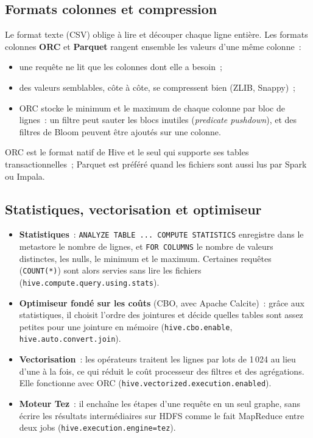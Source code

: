 \subsection{Formats colonnes et compression}

\noindent Le format texte (CSV) oblige à lire et découper chaque ligne entière. Les formats colonnes \textbf{ORC} et \textbf{Parquet} rangent ensemble les valeurs d'une même colonne~:
\begin{itemize}
	\item une requête ne lit que les colonnes dont elle a besoin~;
	\item des valeurs semblables, côte à côte, se compressent bien (ZLIB, Snappy)~;
	\item ORC stocke le minimum et le maximum de chaque colonne par bloc de lignes~: un filtre peut sauter les blocs inutiles (\textit{predicate pushdown}), et des filtres de Bloom peuvent être ajoutés sur une colonne.
\end{itemize}

\noindent ORC est le format natif de Hive et le seul qui supporte ses tables transactionnelles~; Parquet est préféré quand les fichiers sont aussi lus par Spark ou Impala.

\subsection{Statistiques, vectorisation et optimiseur}

\begin{itemize}
	\item \textbf{Statistiques}~: \texttt{ANALYZE TABLE ... COMPUTE STATISTICS} enregistre dans le metastore le nombre de lignes, et \texttt{FOR COLUMNS} le nombre de valeurs distinctes, les nulls, le minimum et le maximum. Certaines requêtes (\texttt{COUNT(*)}) sont alors servies sans lire les fichiers (\texttt{hive.compute.query.using.stats}).
	\item \textbf{Optimiseur fondé sur les coûts} (CBO, avec Apache Calcite)~: grâce aux statistiques, il choisit l'ordre des jointures et décide quelles tables sont assez petites pour une jointure en mémoire (\texttt{hive.cbo.enable}, \texttt{hive.auto.convert.join}).
	\item \textbf{Vectorisation}~: les opérateurs traitent les lignes par lots de 1\,024 au lieu d'une à la fois, ce qui réduit le coût processeur des filtres et des agrégations. Elle fonctionne avec ORC (\texttt{hive.vectorized.execution.enabled}).
	\item \textbf{Moteur Tez}~: il enchaîne les étapes d'une requête en un seul graphe, sans écrire les résultats intermédiaires sur HDFS comme le fait MapReduce entre deux jobs (\texttt{hive.execution.engine=tez}).
\end{itemize}

